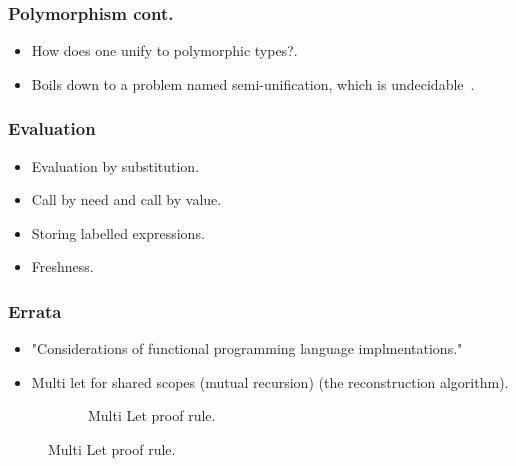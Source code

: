\documentclass{beamer}
\begin{document}
\begin{frame}
\frametitle{Polymorphism cont.}
    \begin{itemize}
        \item How does one unify to polymorphic types?.
        \item Boils down to a problem named semi-unification, which is undecidable~\cite{WELLS1999111,NAMEHERE}.
    \end{itemize}
\end{frame}

\begin{frame}
\frametitle{Evaluation}
    \begin{itemize}
        \item Evaluation by substitution.
        \item Call by need and call by value.
        \item Storing labelled expressions.
        \item Freshness.
    \end{itemize}
\end{frame}


\begin{frame}
\frametitle{Errata}
    \begin{itemize}
        \item "Considerations of functional programming language implmentations."
        \item Multi let for shared scopes (mutual recursion) (the reconstruction algorithm).
    \end{itemize}
    \begin{figure}
    \hspace*{-1.5cm}
    \begin{subfigure}[b]{1\textwidth}
    \begin{prooftree}
    \end{prooftree}
    \caption{Multi Let proof rule.}
    \end{subfigure}
    \end{figure}
\end{frame}
\end{document}
